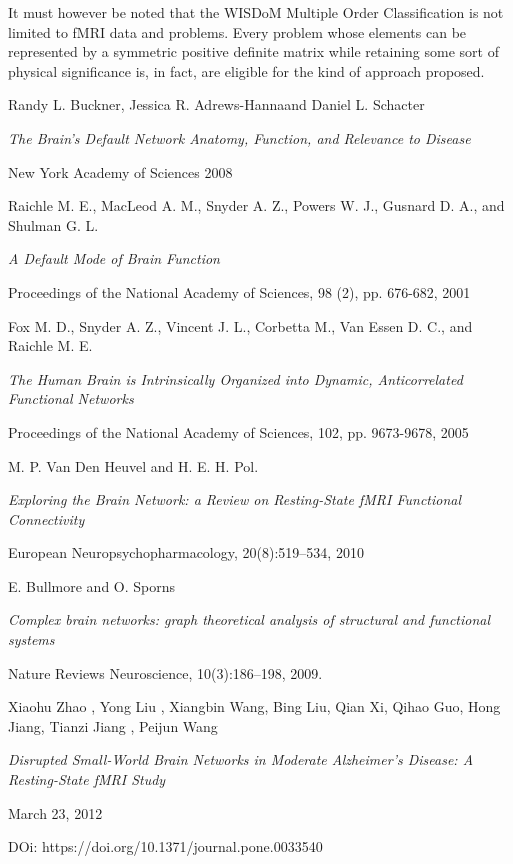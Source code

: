 \documentclass[12pt,openright,twoside,a4paper]{book}
\begin{document}
It must however be noted that the WISDoM Multiple Order Classification is not limited to fMRI data and problems.
Every problem whose elements can be represented by a symmetric positive definite matrix while retaining some sort of physical significance is, in fact, are eligible for the kind of approach proposed.


\begin{thebibliography}{99}

Randy L. Buckner, Jessica R. Adrews-Hannaand Daniel L. Schacter

\emph{The Brain’s Default Network Anatomy, Function, and Relevance to Disease}

New York Academy of Sciences 2008

Raichle M. E., MacLeod A. M., Snyder A. Z., Powers W. J., Gusnard D. A., and Shulman G. L.

\emph{A Default Mode of Brain Function}

Proceedings of the National Academy of Sciences, 98 (2), pp. 676-682, 2001

Fox M. D., Snyder A. Z., Vincent J. L., Corbetta M., Van Essen D. C., and Raichle M. E.

\emph{The Human Brain is Intrinsically Organized into Dynamic, Anticorrelated Functional Networks}

Proceedings of the National Academy of Sciences, 102, pp. 9673-9678, 2005

M. P. Van Den Heuvel and H. E. H. Pol.

\emph{Exploring the Brain Network: a Review on Resting-State fMRI Functional Connectivity}

European Neuropsychopharmacology, 20(8):519–534, 2010

E. Bullmore and O. Sporns

\emph{ Complex brain networks: graph theoretical analysis of structural and functional systems}

 Nature Reviews Neuroscience, 10(3):186–198, 2009.

Xiaohu Zhao , Yong Liu , Xiangbin Wang, Bing Liu, Qian Xi, Qihao Guo, Hong Jiang, Tianzi Jiang , Peijun Wang 

\emph{Disrupted Small-World Brain Networks in Moderate Alzheimer's Disease: A Resting-State fMRI Study}

March 23, 2012

DOi: https://doi.org/10.1371/journal.pone.0033540


\end{thebibliography}
\end{document}

